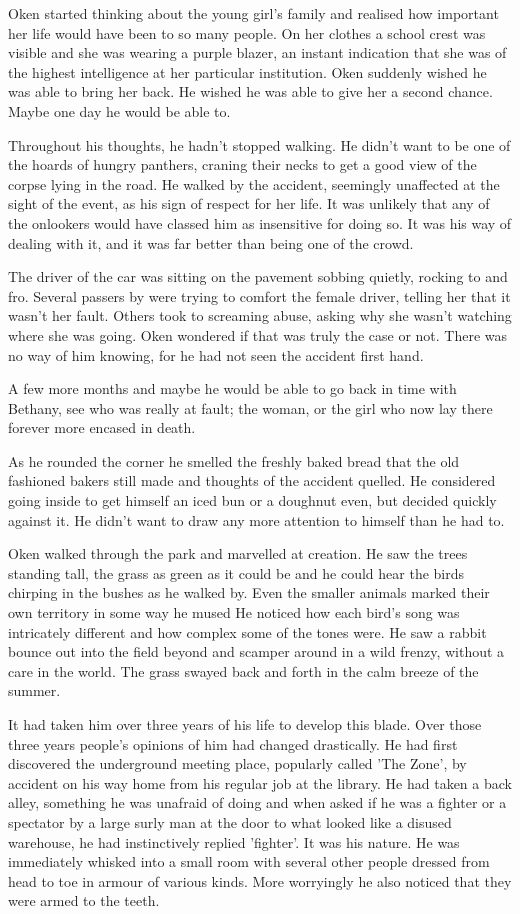 Oken started thinking about the young girl's family and realised how important her life would have been to so many people. On her clothes a school crest was visible and she was wearing a purple blazer, an instant indication that she was of the highest intelligence at her particular institution. Oken suddenly wished he was able to bring her back. He wished he was able to give her a second chance. Maybe one day he would be able to. 

Throughout his thoughts, he hadn't stopped walking. He didn't want to be one of the hoards of hungry panthers, craning their necks to get a good view of the corpse lying in the road. He walked by the accident, seemingly unaffected at the sight of the event, as his sign of respect for her life. It was unlikely that any of the onlookers would have classed him as insensitive for doing so. It was his way of dealing with it, and it was far better than being one of the crowd.

The driver of the car was sitting on the pavement sobbing quietly, rocking to and fro. Several passers by were trying to comfort the female driver, telling her that it wasn't her fault. Others took to screaming abuse, asking why she wasn't watching where she was going. Oken wondered if that was truly the case or not. There was no way of him knowing, for he had not seen the accident first hand. 

A few more months and maybe he would be able to go back in time with Bethany, see who was really at fault; the woman, or the girl who now lay there forever more encased in death.

As he rounded the corner he smelled the freshly baked bread that the old fashioned bakers still made and thoughts of the accident quelled. He considered going inside to get himself an iced bun or a doughnut even, but decided quickly against it. He didn't want to draw any more attention to himself than he had to.

Oken walked through the park and marvelled at creation. He saw the trees standing tall, the grass as green as it could be and he could hear the birds chirping in the bushes as he walked by. Even the smaller animals marked their own territory in some way he mused He noticed how each bird's song was intricately different and how complex some of the tones were. He saw a rabbit bounce out into the field beyond and scamper around in a wild frenzy, without a care in the world. The grass swayed back and forth in the calm breeze of the summer. 

It had taken him over three years of his life to develop this blade. Over those three years people's opinions of him had changed drastically. He had first discovered the underground meeting place, popularly called 'The Zone', by accident on his way home from his regular job at the library. He had taken a back alley, something he was unafraid of doing and when asked if he was a fighter or a spectator by a large surly man at the door to what looked like a disused warehouse, he had instinctively replied 'fighter'. It was his nature. He was immediately whisked into a small room with several other people dressed from head to toe in armour of various kinds. More worryingly he also noticed that they were armed to the teeth. 


